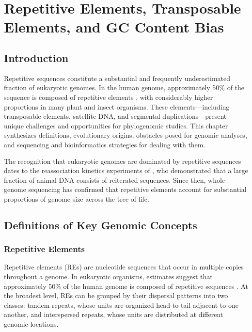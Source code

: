 \chapter{Repetitive Elements, Transposable Elements, and GC Content Bias}

\section{Introduction}

Repetitive sequences constitute a substantial and frequently underestimated fraction of eukaryotic genomes. In the human genome, approximately 50\% of the sequence is composed of repetitive elements \parencite{lander2001,dekonig2011}, with considerably higher proportions in many plant and insect organisms. These elements---including transposable elements, satellite DNA, and segmental duplications---present unique challenges and opportunities for phylogenomic studies. This chapter synthesizes definitions, evolutionary origins, obstacles posed for genomic analyses, and sequencing and bioinformatics strategies for dealing with them.

The recognition that eukaryotic genomes are dominated by repetitive sequences dates to the reassociation kinetics experiments of \textcite{britten1968}, who demonstrated that a large fraction of animal DNA consists of reiterated sequences. Since then, whole-genome sequencing has confirmed that repetitive elements account for substantial proportions of genome size across the tree of life.

\section{Definitions of Key Genomic Concepts}

\subsection{Repetitive Elements}

Repetitive elements (REs) are nucleotide sequences that occur in multiple copies throughout a genome. In eukaryotic organisms, estimates suggest that approximately 50\% of the human genome is composed of repetitive sequences \parencite{haubold2006}. At the broadest level, REs can be grouped by their dispersal patterns into two classes: tandem repeats, whose units are organized head-to-tail adjacent to one another, and interspersed repeats, whose units are distributed at different genomic locations.

